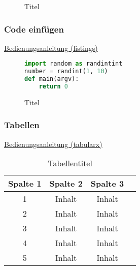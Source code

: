 \documentclass[a4paper, 11pt]{article}
\begin{document}
\par\medskip
\begin{figure}[!ht]
  \centering
  \caption[Titel in Abbildungsverzeichnis(Flowchart)]{Titel}
  \label{fig:ExampleFlowchart}
\end{figure}
\newpage

\subsubsection{Code einfügen}

\href{https://texdoc.org/serve/listings.pdf/0}{Bedienungsanleitung (listings)}

\begin{figure}[!ht]
\begin{lstlisting}[language=Python]
import random as randintint 
number = randint(1, 10)
def main(argv):
    return 0
\end{lstlisting}
\caption[Titel in Abbildungsverzeichnis (Code)]{Titel\footnotemark}
\label{fig:ExampleCode}
\end{figure}
\newpage

\subsubsection{Tabellen}

\href{https://texdoc.org/serve/tabularx/0}{Bedienungsanleitung (tabularx)}

\begin{table}[!ht]
\begin{tabular}{||c c c c||}
\hline
Spalte 1 & Spalte 2 & Spalte 3 \\ [0.5ex]
\hline\hline
1 & Inhalt & Inhalt \\
2 & Inhalt & Inhalt \\
3 & Inhalt & Inhalt \\
4 & Inhalt & Inhalt \\
5 & Inhalt & Inhalt \\ [1ex]
\hline
\end{tabular}
\caption[Tabellenname im Tabellenverzeichnis]{Tabellentitel\footnotemark}
\label{table:ExampleTable}
\end{table}
\newpage
\end{document}
